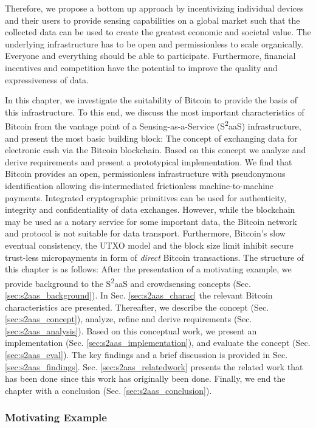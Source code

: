 Therefore, we propose a bottom up approach by incentivizing individual devices and their users to provide sensing capabilities on a global market such that the collected data can be used to create the greatest economic and societal value.
The underlying infrastructure has to be open and permissionless to scale organically. Everyone and everything should be able to participate. Furthermore, financial incentives and competition have the potential to improve the quality and expressiveness of data. 

In this chapter, we investigate the suitability of Bitcoin to provide the basis of this infrastructure. To this end, we discuss the most important characteristics of Bitcoin from the vantage point of a Sensing-as-a-Service (S\textsuperscript{2}aaS) infrastructure, and present the most basic building block: The concept of exchanging data for electronic cash via the Bitcoin blockchain. Based on this concept we analyze and derive requirements and present a prototypical implementation. We find that Bitcoin provides an open, permissionless infrastructure with pseudonymous identification allowing dis-intermediated frictionless machine-to-machine payments. Integrated cryptographic primitives can be used for authenticity, integrity and confidentiality of data exchanges. However, while the blockchain may be used as a notary service for some important data, the Bitcoin network and protocol is not suitable for data transport. Furthermore, Bitcoin's slow eventual consistency, the \ac{UTXO} model and the block size limit inhibit secure trust-less micropayments in form of \emph{direct} Bitcoin transactions.
The structure of this chapter is as follows: After the presentation of a motivating example, we provide background to the S\textsuperscript{2}aaS and crowdsensing concepts (Sec. \ref{sec:s2aas_background}). In Sec. \ref{sec:s2aas_charac} the relevant Bitcoin characteristics are presented. Thereafter, we describe the concept (Sec. \ref{sec:s2aas_concept}), analyze, refine and derive requirements (Sec. \ref{sec:s2aas_analysis}). Based on this conceptual work, we present an implementation (Sec. \ref{sec:s2aas_implementation}), and evaluate the concept (Sec. \ref{sec:s2aas_eval}). The key findings and a brief discussion is provided in Sec. \ref{sec:s2aas_findings}. Sec. \ref{sec:s2aas_relatedwork} presents the related work that has been done since this work has originally been done. Finally, we end the chapter with a conclusion (Sec. \ref{sec:s2aas_conclusion}).

\subsubsection*{Motivating Example}

